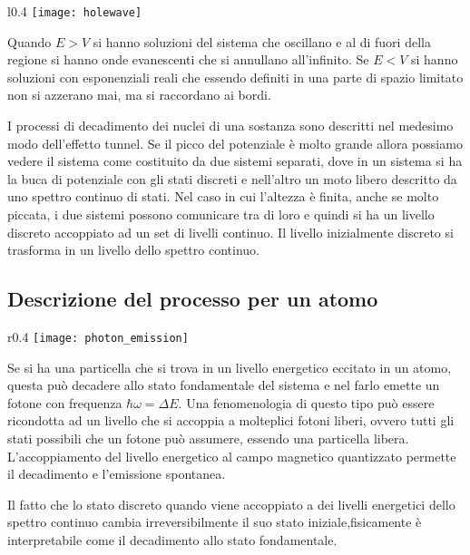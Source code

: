 \begin{wrapfigure}{l}{0.4\textwidth}
    \centering
    \texttt{[image: holewave]} %
\end{wrapfigure}

Quando $E>V$ si hanno soluzioni del sistema che oscillano e al di fuori della regione si hanno onde evanescenti che si annullano all'infinito. Se $E <V$ si hanno soluzioni con esponenziali reali che essendo definiti in una parte di spazio limitato non si azzerano mai, ma si raccordano ai bordi. 

I processi di decadimento dei nuclei di una sostanza sono descritti nel medesimo modo dell'effetto tunnel. Se il picco del potenziale \`e molto grande allora possiamo vedere il sistema come costituito da due sistemi separati, dove in un sistema si ha la buca di potenziale con gli stati discreti e nell'altro un moto libero descritto da uno spettro continuo di stati. Nel caso in cui l'altezza \`e finita, anche se molto piccata, i due sistemi possono comunicare tra di loro e quindi si ha un livello discreto accoppiato ad un set di livelli continuo. Il livello inizialmente discreto si trasforma in un livello dello spettro continuo.

\subsection{Descrizione del processo per un atomo}

\begin{wrapfigure}{r}{0.4\textwidth}
    \centering
    \texttt{[image: photon\_emission]} %
\end{wrapfigure}


Se si ha una particella che si trova in un livello energetico eccitato in un atomo, questa pu\`o decadere allo stato fondamentale del sistema e nel farlo emette un fotone con frequenza $\hbar \omega = \Delta E$.
Una fenomenologia di questo tipo pu\`o essere ricondotta ad un livello che si accoppia a molteplici fotoni liberi, ovvero tutti gli stati possibili che un fotone pu\`o assumere, essendo una particella libera. L'accoppiamento del livello energetico al campo magnetico quantizzato permette il decadimento e l'emissione spontanea.

Il fatto che lo stato discreto quando viene accoppiato a dei livelli energetici dello spettro continuo cambia irreversibilmente il suo stato iniziale,fisicamente \`e interpretabile come il decadimento allo stato fondamentale.

